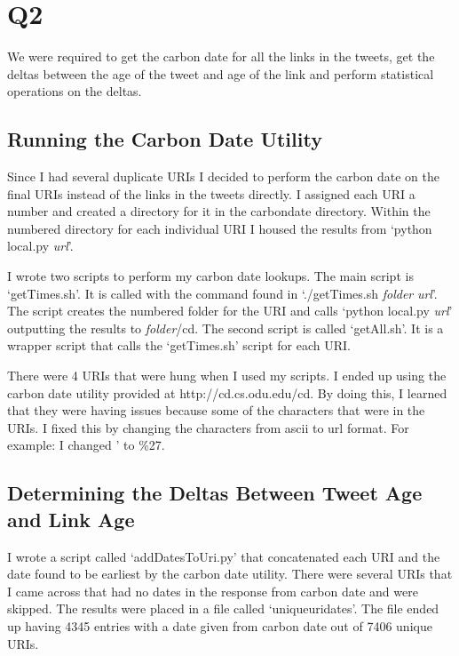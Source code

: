\documentclass[12pt]{article}
\begin{document}
\section{Q2}

We were required to get the carbon date for all the links in the tweets, get the deltas between the age of the tweet and age of the link and perform statistical operations on the deltas.

\subsection{Running the Carbon Date Utility}

Since I had several duplicate URIs I decided to perform the carbon date on the final URIs instead of the links in the tweets directly.  I assigned each URI a number and created a directory for it in the carbondate directory.  Within the numbered directory for each individual URI I housed the results from `python local.py \textit{url}'.

I wrote two scripts to perform my carbon date lookups.  The main script is `getTimes.sh'.  It is called with the command found in `./getTimes.sh \textit{folder} \textit{url}'.  The script creates the numbered folder for the URI and calls `python local.py \textit{url}' outputting the results to \textit{folder}/cd.  The second script is called `getAll.sh'.  It is a wrapper script that calls the `getTimes.sh' script for each URI.

There were 4 URIs that were hung when I used my scripts.  I ended up using the carbon date utility provided at http://cd.cs.odu.edu/cd.  By doing this, I learned that they were having issues because some of the characters that were in the URIs.  I fixed this by changing the characters from ascii to url format.  For example: I changed ' to \%27.

\subsection{Determining the Deltas Between Tweet Age and Link Age}

I wrote a script called `addDatesToUri.py' that concatenated each URI and the date found to be earliest by the carbon date utility.  There were several URIs that I came across that had no dates in the response from carbon date and were skipped. The results were placed in a file called `uniqueuridates'.  The file ended up having 4345 entries with a date given from carbon date out of 7406 unique URIs.
\end{document}
